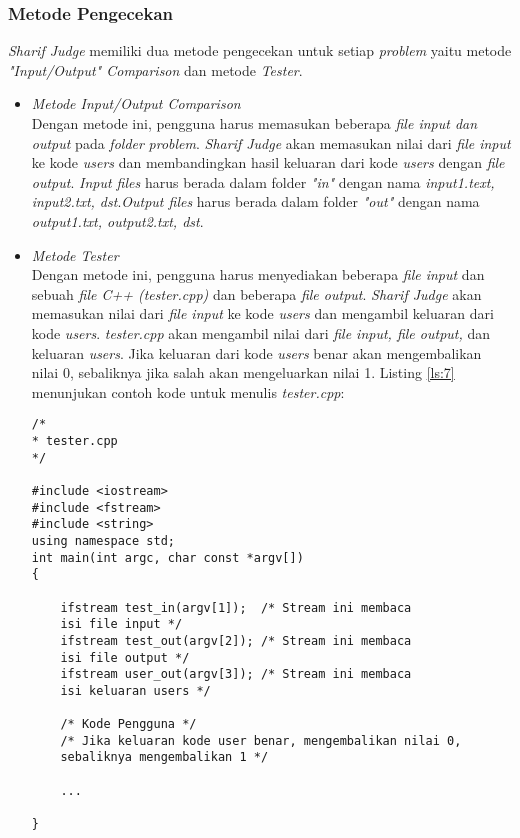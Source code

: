 \subsubsection{Metode Pengecekan}
\textit{Sharif Judge} memiliki dua metode pengecekan untuk setiap \textit{problem} yaitu metode \textit{"Input/Output" Comparison} dan metode \textit{Tester}.
\begin{itemize}
	\item \textit{Metode Input/Output Comparison} \\
	Dengan metode ini, pengguna harus memasukan beberapa \textit{file input dan output} pada \textit{folder} \textit{problem}. \textit{Sharif Judge} akan memasukan nilai dari \textit{file input} ke kode \textit{users} dan membandingkan hasil keluaran dari kode \textit{users} dengan \textit{file output}. \textit{Input files} harus berada dalam folder \textit{"in"} dengan nama \textit{input1.text, input2.txt, dst}.\textit{Output files} harus berada dalam folder \textit{"out"} dengan nama \textit{output1.txt, output2.txt, dst}.
	
	\item \textit{Metode Tester} \\
	Dengan metode ini, pengguna harus menyediakan beberapa \textit{file input} dan sebuah \textit{file C++ (tester.cpp)} dan beberapa \textit{file output}. \textit{Sharif Judge} akan memasukan nilai dari \textit{file input} ke kode \textit{users} dan mengambil keluaran dari kode \textit{users}. \textit{tester.cpp} akan mengambil nilai dari \textit{file input, file output, }dan keluaran \textit{users}. Jika keluaran dari kode \textit{users} benar akan mengembalikan nilai 0, sebaliknya jika salah akan mengeluarkan nilai 1. Listing \ref{ls:7} menunjukan contoh kode untuk menulis \textit{tester.cpp}:
	\begin{lstlisting}[basicstyle=\ttfamily, caption=Contoh kode \textit{tester.cpp}, label=ls:7, frame=single,
columns=fullflexible, keepspaces=true, breaklines=true]
/*
* tester.cpp
*/

#include <iostream>
#include <fstream>
#include <string>
using namespace std;
int main(int argc, char const *argv[])
{
	
	ifstream test_in(argv[1]);  /* Stream ini membaca 
	isi file input */
	ifstream test_out(argv[2]); /* Stream ini membaca 
	isi file output */
	ifstream user_out(argv[3]); /* Stream ini membaca 
	isi keluaran users */
	
	/* Kode Pengguna */
	/* Jika keluaran kode user benar, mengembalikan nilai 0, 
	sebaliknya mengembalikan 1 */
	
	...

}
\end{lstlisting}
\end{itemize}

